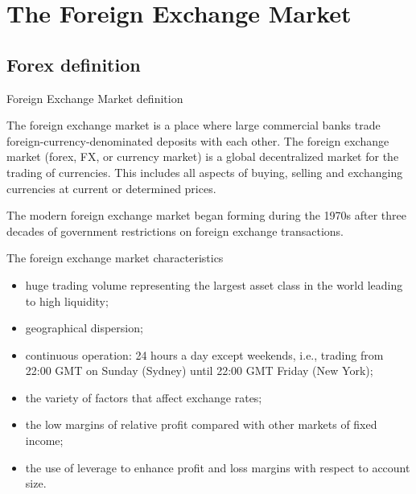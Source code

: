 \documentclass[international_finance_p1.tex]{subfiles}
\begin{document}
\section{The Foreign Exchange Market}
\subsection{Forex definition}
\begin{frame}{Foreign Exchange Market definition}
\begin{block}{The foreign exchange market }
is a place where large commercial banks trade foreign-currency-denominated deposits with each other.
The foreign exchange market (forex, FX, or currency market) is a global decentralized market for the trading of currencies. This includes all aspects of buying, selling and exchanging currencies at current or determined prices.
\end{block}
The modern foreign exchange market began forming during the 1970s after three decades of government restrictions on foreign exchange transactions.
\end{frame}
\begin{frame}{The foreign exchange market characteristics}
\begin{itemize}[<+->]
\item
huge trading volume representing the largest asset class in the world leading to high liquidity;
\item
geographical dispersion;
\item
continuous operation: 24 hours a day except weekends, i.e., trading from 22:00 GMT on Sunday (Sydney) until 22:00 GMT Friday (New York);
\item
the variety of factors that affect exchange rates;
\item
the low margins of relative profit compared with other markets of fixed income; 
\item
the use of leverage to enhance profit and loss margins with respect to account size.
\end{itemize}
\end{frame}
\end{document}
